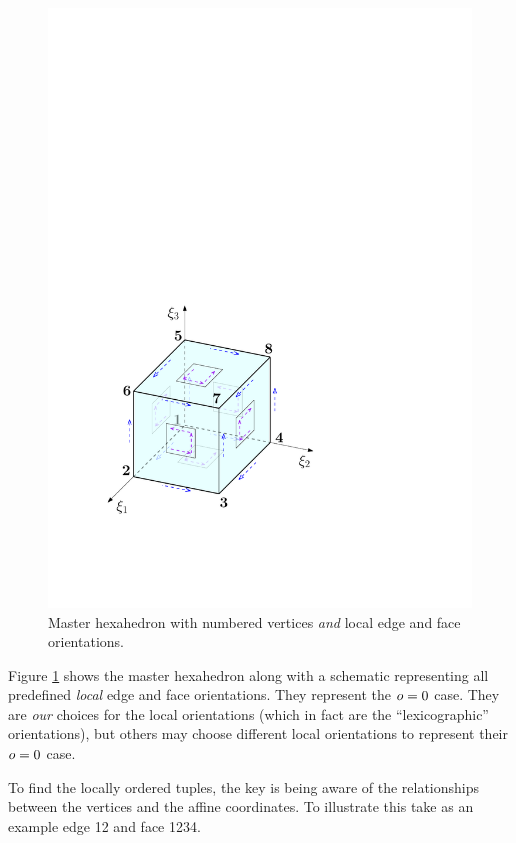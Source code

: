 \begin{figure}[!ht]
\begin{center}
\includegraphics[scale=0.5]{./figures/MasterHexaOrientations.pdf}
\caption{Master hexahedron with numbered vertices \textit{and} local edge and face orientations.}
\label{fig:MasterHexaOrientations}
\end{center}
\end{figure}

Figure \ref{fig:MasterHexaOrientations} shows the master hexahedron along with a schematic representing all predefined \textit{local} edge and face orientations.
They represent the $o=0$ case.
They are \textit{our} choices for the local orientations (which in fact are the ``lexicographic'' orientations), but others may choose different local orientations to represent their $o=0$ case.

To find the locally ordered tuples, the key is being aware of the relationships between the vertices and the affine coordinates.
To illustrate this take as an example edge 12 and face 1234.

